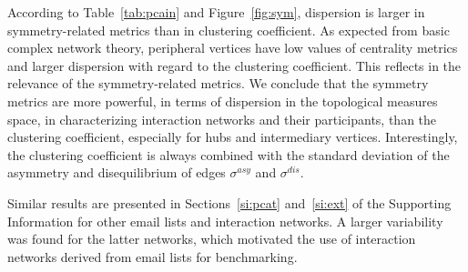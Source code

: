 \documentclass[%
	aip,
	jmp,%
	amsmath,amssymb,
	reprint,%
]{revtex4-1}
\begin{document}
																																																																																					According to Table~\ref{tab:pcain} and Figure~\ref{fig:sym},
																																																																																					dispersion is larger in symmetry-related metrics than in clustering coefficient. As expected from basic complex network theory, peripheral vertices have low values of centrality metrics and larger dispersion with regard to the clustering coefficient.
																																																																																					This reflects in the relevance of the symmetry-related metrics.
																																																																																					We conclude that the symmetry metrics are more powerful, in terms of dispersion in the topological measures space, in characterizing interaction networks and their participants, than the clustering coefficient, especially for hubs and intermediary vertices.
																																																																																					Interestingly, the clustering coefficient is always combined
																																																																																					with the standard deviation of the asymmetry and disequilibrium
																																																																																					of edges $\sigma^{asy}$ and $\sigma^{dis}$.

																																																																																					Similar results are presented in Sections~\ref{si:pcat} and~\ref{si:ext}
																																																																																					of the Supporting Information for other email lists and interaction networks. A larger variability was found for the latter networks,
																																																																																					which motivated the use of interaction networks derived from email lists for benchmarking.
\end{document}
